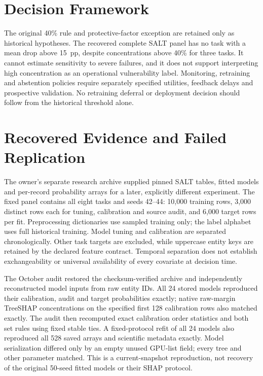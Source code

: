 \documentclass[accepted]{uai2026} %
\begin{document}
\section{Decision Framework}\label{sec:framework}

The original 40\% rule and protective-factor exception are retained only as historical hypotheses. The recovered complete SALT panel has no task with a mean drop above 15~pp, despite concentrations above 40\% for three tasks. It cannot estimate sensitivity to severe failures, and it does not support interpreting high concentration as an operational vulnerability label. Monitoring, retraining and abstention policies require separately specified utilities, feedback delays and prospective validation. No retraining deferral or deployment decision should follow from the historical threshold alone.

\section{Recovered Evidence and Failed Replication}\label{sec:recovered}

The owner's separate research archive supplied pinned SALT tables, fitted models and per-record probability arrays for a later, explicitly different experiment. The fixed panel contains all eight tasks and seeds 42--44: 10,000 training rows, 3,000 distinct rows each for tuning, calibration and source audit, and 6,000 target rows per fit. Preprocessing dictionaries use sampled training only; the label alphabet uses full historical training. Model tuning and calibration are separated chronologically. Other task targets are excluded, while uppercase entity keys are retained by the declared feature contract. Temporal separation does not establish exchangeability or universal availability of every covariate at decision time.

The October audit restored the checksum-verified archive and independently reconstructed model inputs from raw entity IDs. All 24 stored models reproduced their calibration, audit and target probabilities exactly; native raw-margin TreeSHAP concentrations on the specified first 128 calibration rows also matched exactly. The audit then recomputed exact calibration order statistics and both set rules using fixed stable ties. A fixed-protocol refit of all 24 models also reproduced all 528 saved arrays and scientific metadata exactly. Model serialization differed only by an empty unused GPU-list field; every tree and other parameter matched. This is a current-snapshot reproduction, not recovery of the original 50-seed fitted models or their SHAP protocol.
\end{document}
